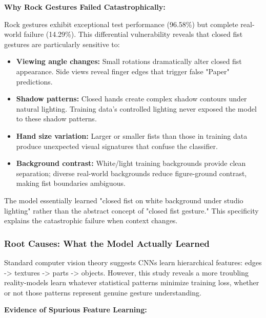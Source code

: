 \documentclass[12pt,a4paper]{article}
\begin{document}
\textbf{Why Rock Gestures Failed Catastrophically:}

Rock gestures exhibit exceptional test performance (96.58\%) but complete real-world failure (14.29\%). This differential vulnerability reveals that closed fist gestures are particularly sensitive to:

\begin{itemize}
    \item \textbf{Viewing angle changes:} Small rotations dramatically alter closed fist appearance. Side views reveal finger edges that trigger false "Paper" predictions.
    
    \item \textbf{Shadow patterns:} Closed hands create complex shadow contours under natural lighting. Training data's controlled lighting never exposed the model to these shadow patterns.
    
    \item \textbf{Hand size variation:} Larger or smaller fists than those in training data produce unexpected visual signatures that confuse the classifier.
    
    \item \textbf{Background contrast:} White/light training backgrounds provide clean separation; diverse real-world backgrounds reduce figure-ground contrast, making fist boundaries ambiguous.
\end{itemize}

The model essentially learned "closed fist on white background under studio lighting" rather than the abstract concept of "closed fist gesture." This specificity explains the catastrophic failure when context changes.

\subsubsection{Root Causes: What the Model Actually Learned}

Standard computer vision theory suggests CNNs learn hierarchical features: edges -> textures -> parts -> objects. However, this study reveals a more troubling reality-models learn whatever statistical patterns minimize training loss, whether or not those patterns represent genuine gesture understanding.

\textbf{Evidence of Spurious Feature Learning:}
\end{document}
